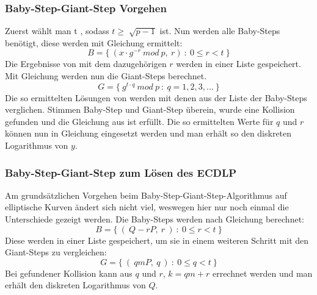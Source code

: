 		\subsubsection{Baby-Step-Giant-Step Vorgehen}
			Zuerst wählt man t \myin {}, sodass $t \geq \sqrt[]{p-1}$ ist. Nun werden alle Baby-Steps benötigt, diese werden mit Gleichung  ermittelt:
			\begin{equation}
				B = \{~(x \cdot g^{-r}~mod~p,~r)~:~0 \leq r < t~\}
			\label{Gleichung Baby steps}
			\end{equation}
			Die Ergebnisse von  mit dem dazugehörigen $r$ werden in einer Liste gespeichert. Mit Gleichung  werden nun die Giant-Steps berechnet.
			\begin{equation}
				G = \{~g^{t \cdot q}~mod~p~:~q = 1,2,3,...~\}
			\label{Gleichung Giant steps}
			\end{equation}
			Die so ermittelten Lösungen von  werden mit denen aus der Liste der Baby-Steps verglichen. Stimmen Baby-Step und Giant-Step überein, wurde eine Kollision gefunden und die Gleichung aus  ist erfüllt. Die so ermittelten Werte für $q$ und $r$ können nun in Gleichung  eingesetzt werden und man erhält so den diskreten Logarithmus von $y$.
		\subsubsection{Baby-Step-Giant-Step zum Lösen des ECDLP}
			Am grundsätzlichen Vorgehen beim Baby-Step-Giant-Step-Algorithmus auf elliptische Kurven ändert sich nicht viel, weswegen hier nur noch einmal die Unterschiede gezeigt werden. Die Baby-Steps werden nach Gleichung  berechnet:
			\begin{equation}
				B = \{~(~Q- rP,~r~)~:~0 \leq r < t~\}
				\label{Gleichung Baby steps für elliptische Kurven}
			\end{equation}
			Diese werden in einer Liste gespeichert, um sie in einem weiteren Schritt mit den Giant-Steps zu vergleichen:
			\begin{equation}
				G = \{~(~qmP,~q~)~:~0 \leq q < t~\}
				\label{Gleichung Giant steps für elliptische Kurven}
			\end{equation}
			Bei gefundener Kollision kann aus $q$ und $r$, $k = qm + r$ errechnet werden und man erhält den diskreten Logarithmus von $Q$.
